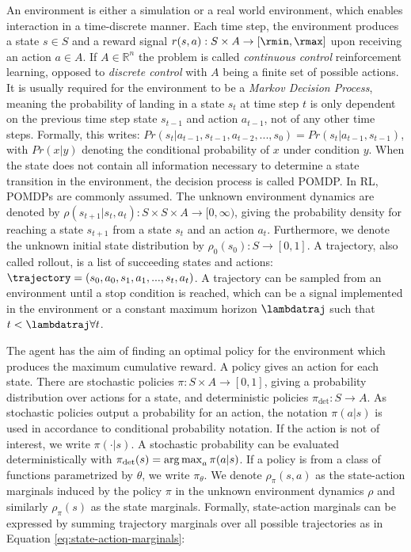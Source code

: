 An environment is either a simulation or a real world environment, which enables interaction in a time-discrete manner. Each time step, the environment produces a state $s \in S$ and a reward signal $r(s,a): S \times A \rightarrow [\rmin, \rmax]$ upon receiving an action $a \in A$. If $A \in \mathbb{R}^n$ the problem is called \textit{continuous control} reinforcement learning, opposed to \textit{discrete control} with $A$ being a finite set of possible actions. It is usually required for the environment to be a \textit{Markov Decision Process}, meaning the probability of landing in a state $s_t$ at time step $t$ is only dependent on the previous time step state $s_{t-1}$ and action $a_{t-1}$, not of any other time steps. Formally, this writes: $Pr(s_t | a_{t-1}, s_{t-1}, a_{t-2}, ... , s_0) = Pr(s_t | a_{t-1}, s_{t-1})$, with $Pr(x|y)$ denoting the conditional probability of $x$ under condition $y$. When the state does not contain all information necessary to determine a state transition in the environment, the decision process is called \acf{POMDP}. In \ac{RL}, \acp{POMDP} are commonly assumed. The unknown environment dynamics are denoted by $\rho(s_{t+1}|s_t,a_t): S \times S \times A \rightarrow [0, \infty)$, giving the probability density for reaching a state $s_{t+1}$ from a state $s_t$ and an action $a_t$. Furthermore, we denote the unknown initial state distribution by $\rho_0(s_0) : S \rightarrow [0,1]$. A trajectory, also called rollout, is a list of succeeding states and actions: $\trajectory = (s_0, a_0, s_1, a_1, ..., s_t, a_t)$. A trajectory can be sampled from an environment until a stop condition is reached, which can be a signal implemented in the environment or a constant maximum horizon $\lambdatraj$ such that $t < \lambdatraj \forall t$.

The agent has the aim of finding an optimal policy for the environment which produces the maximum cumulative reward. A policy gives an action for each state. There are stochastic policies $\pi : S \times A \rightarrow [0,1]$, giving a probability distribution over actions for a state, and deterministic policies $\pi_{\text{det}} : S \rightarrow A$. As stochastic policies output a probability for an action, the notation $\pi(a|s)$ is used in accordance to conditional probability notation. If the action is not of interest, we write $\pi(\cdot|s)$. A stochastic probability can be evaluated deterministically with $\pi_{\text{det}}(s) = \operatorname*{arg\,max}_{a} \pi(a|s)$. If a policy is from a class of functions parametrized by $\theta$, we write $\pi_{\theta}$. We denote $\rho_{\pi}(s, a)$ as the state-action marginals induced by the policy $\pi$ in the unknown environment dynamics $\rho$ and similarly $\rho_{\pi}(s)$ as the state marginals. Formally, state-action marginals can be expressed by summing trajectory marginals over all possible trajectories as in Equation \ref{eq:state-action-marginals}:

